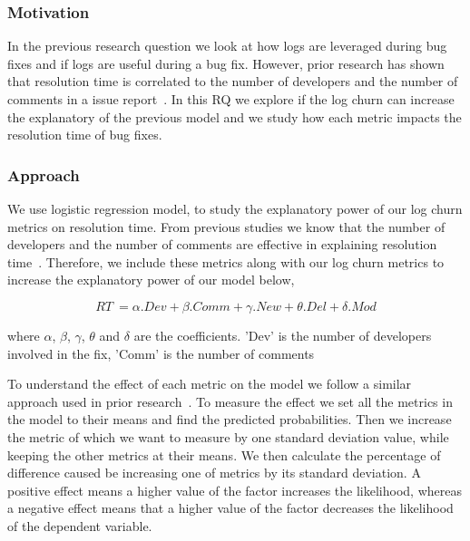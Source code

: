 \documentclass[conference]{IEEEtran}
\begin{document}
\subsubsection*{\textbf{Motivation}}

In the previous research question we look at how logs are leveraged during bug fixes and if logs are useful during a bug fix. However, prior research has shown that resolution time is correlated to the number of developers and the number of comments in a issue report~\cite{RTpredictions}. In this RQ we explore if the log churn can increase the explanatory of the previous model and we study how each metric impacts the resolution time of bug fixes.

\subsubsection*{\textbf{Approach}}

We use logistic regression model, to study the explanatory power of our log churn metrics on resolution time. From previous studies we know that the number of developers and the number of  comments are effective in explaining resolution time~\cite {RTpredictions}. Therefore, we include these metrics along with our log churn metrics to increase the explanatory power of our model below,  

\begin{equation}
RT\ =  \alpha.Dev + \beta.Comm + \gamma.New + \theta.Del + \delta.Mod
\label{eq1}
\end{equation}

where $\alpha$, $\beta$, $\gamma$, $\theta$ and $\delta$ are the coefficients. 'Dev' is the number of developers involved in the fix, 'Comm' is the 	number of comments


To understand the effect of each metric on the model we follow a similar approach used in prior research~\cite{shihab,mocku}. To measure the effect we set all the metrics in the model to their means and find the predicted probabilities. Then we increase the metric of which we want to measure by one standard deviation value, while keeping the other metrics at their means. We then calculate the percentage of difference caused be increasing one of metrics by its standard deviation. A positive effect means a higher value of the factor increases the likelihood, whereas a negative effect means that a higher value of the factor decreases the likelihood of the dependent variable.
\end{document}
